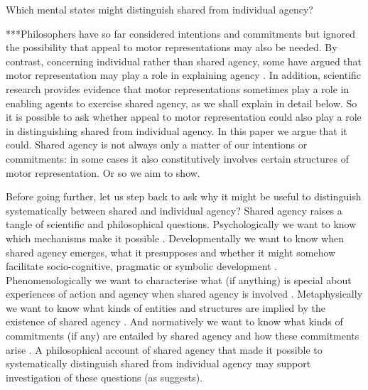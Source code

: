 \documentclass[12pt,\papersize]{extarticle}
\begin{document}
Which mental states might distinguish shared from individual agency?

 




***Philosophers have so far considered intentions and commitments but ignored the possibility that appeal to motor representations may also be needed. 
By contrast, concerning individual rather than shared agency, some have argued that motor representation may play a role in explaining agency \citep[e.g.][]{pacherie:2000_content,pacherie:2008_action,butterfill:2012_intention}. 
In addition, scientific research provides evidence that motor representations sometimes play a role in enabling agents to exercise shared agency, as we shall explain in detail below.
So it is possible to ask whether appeal to motor representation  %
could also play a role in distinguishing shared from individual agency.
In this paper we argue that it could.
Shared agency is not always only a matter of our intentions or commitments: in some cases it also constitutively involves certain structures of motor representation.
Or so we aim to show.

Before going further,
let us step back to ask 
	why it might be useful 
	to  distinguish systematically between shared and individual agency?
Shared agency raises a tangle of scientific and philosophical questions.  Psychologically we want to know which mechanisms make it possible \citep{Sebanz:2006yq,vesper_minimal_2010}.  
Developmentally we want to know when shared agency emerges, what it presupposes and whether it might somehow facilitate socio-cognitive, pragmatic or symbolic development \citep{Moll:2007gu,Hughes:2004zj,Brownell:2006gu}.  
Phenomenologically we want to characterise what (if anything) is special about experiences of action and agency when shared agency is involved \citep{Pacherie:2010fk}.  
Metaphysically we want to know what kinds of entities and structures are implied by the existence of shared agency \citep{Gilbert:1992rs,Searle:1994lb}.  
And normatively we want to know what kinds of commitments (if any) are entailed by shared agency and how these commitments arise \citep{Roth:2004ki}.
A philosophical account of shared agency 
that made it possible to systematically distinguish shared from individual agency  
may support investigation of these questions (as \citealp{Bratman:2009lv} suggests).  
\end{document}
